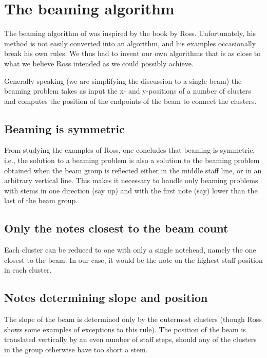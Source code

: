 \chapter{The beaming algorithm}

The beaming algorithm of {\gs} was inspired by the book by Ross.
Unfortunately, his method is not easily converted into an algorithm,
and his examples occasionally break his own rules.  We thus had to
invent our own algorithms that is as close to what we believe Ross
intended as we could possibly achieve. 

Generally speaking (we are simplifying the discussion to a single
beam) the beaming problem takes as input the x- and y-positions of a
number of clusters and computes the position of the endpoints of the
beam to connect the clusters. 

\section{Beaming is symmetric}

From studying the examples of Ross, one concludes that beaming
is symmetric, i.e., the solution to a beaming problem is also a
solution to the beaming problem obtained when the beam group is
reflected either in the middle staff line, or in an arbitrary vertical
line.  This makes it necessary to handle only beaming problems with
stems in one direction (say up) and with the first note (say) lower
than the last of the beam group. 

\section{Only the notes closest to the beam count}

Each cluster can be reduced to one with only a single notehead, namely
the one closest to the beam.  In our case, it would be the note on the
highest staff position in each cluster.

\section{Notes determining slope and position}

The slope of the beam is determined only by the outermost clusters
(though Ross shows some examples of exceptions to this rule).  The
position of the beam is translated vertically by an even number of
staff steps, should any of the clusters in the group otherwise have
too short a stem. 


